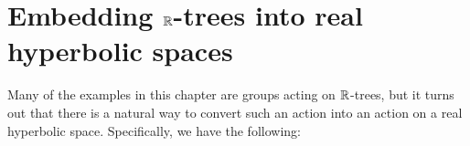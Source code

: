 %
%

\section{Embedding $\R$-trees into real hyperbolic spaces}
Many of the examples in this chapter are groups acting on $\R$-trees, but it turns out that there is a natural way to convert such an action into an action on a real hyperbolic space. Specifically, we have the following:

